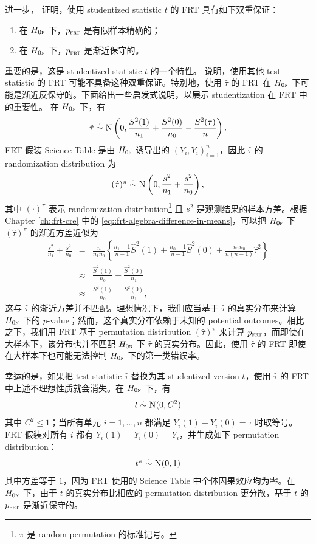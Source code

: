 进一步，\citet{ding2017randomization} 证明，使用 studentized statistic $t$ 的 FRT 具有如下双重保证：
\begin{enumerate}
\item 
 在 $H_{0\textsc{f}}$ 下，$p_{\textsc{frt}}$ 是有限样本精确的；
\item
 在 $H_{0\textsc{n}}$ 下，$p_{\textsc{frt}}$ 是渐近保守的。
\end{enumerate}
重要的是，这是 studentized statistic $t$ 的一个特性。\citet{ding2017randomization} 说明，使用其他 test statistic 的 FRT 可能不具备这种双重保证。特别地，使用 $\hat{\tau}$ 的 FRT 在 $H_{0\textsc{n}}$ 下可能是渐近反保守的。下面给出一些启发式说明，以展示 studentization 在 FRT 中的重要性。
在 $H_{0\textsc{n}}$ 下，有
$$
\hat{\tau} \stackrel{\cdot}{\sim} \textsc{N}\left(0,    \frac{S^2(1)}{n_1} + \frac{S^2(0)}{n_0} -  \frac{S^2(\tau)}{n}    \right).
$$
FRT 假装 Science Table 是由 $H_{0\textsc{f}}$ 诱导出的 $(Y_i, Y_i)_{i=1}^n$，因此 $\hat{\tau} $ 的 randomization distribution 为
$$
(\hat{\tau} )^\pi \stackrel{\cdot}{\sim} \textsc{N}\left(0,    \frac{s^2}{n_1} + \frac{s^2}{n_0}    \right),
$$
其中 $(\cdot)^\pi$ 表示 randomization distribution\footnote{$\pi$ 是 random permutation 的标准记号。}
且
$
s^2 
$
是观测结果的样本方差。根据 Chapter \ref{ch::frt-cre} 中的 \eqref{eq::frt-algebra-difference-in-means}，可以把 $H_{0\textsc{f}}$ 下 $(\hat{\tau} )^\pi$ 的渐近方差近似为
\begin{eqnarray*}
\frac{s^2}{n_1} + \frac{s^2}{n_0} 
& =& \frac{n}{n_1 n_0}  \left\{ 
 \frac{n_1 -1}{ n-1 } \hat S^2(1) + \frac{n_0 - 1}{n-1} \hat S^2(0) + \frac{n_1n_0}{n(n-1)} \hat\tau^2
 \right\} \\
&\approx & \frac{\hat S^2(1) }{n_0} +  \frac{\hat S^2(0) }{n_1} \\ 
&\approx & \frac{  S^2(1) }{n_0} +  \frac{  S^2(0) }{n_1},
\end{eqnarray*}
这与 $\hat{\tau} $ 的渐近方差并不匹配。理想情况下，我们应当基于 $\hat{\tau} $ 的真实分布来计算 $H_{0\textsc{n}}$ 下的 $p$-value；然而，这个真实分布依赖于未知的 potential outcomes。相比之下，我们用 FRT 基于 permutation distribution $(\hat{\tau} )^\pi $ 来计算 $p_{\textsc{frt}}$，而即使在大样本下，该分布也并不匹配 $H_{0\textsc{n}}$ 下 $\hat{\tau} $ 的真实分布。因此，使用 $\hat\tau$ 的 FRT 即使在大样本下也可能无法控制 $H_{0\textsc{n}}$ 下的第一类错误率。
 
 
幸运的是，如果把 test statistic $\hat{\tau} $ 替换为其 studentized version $t$，使用 $\hat\tau$ 的 FRT 中上述不理想性质就会消失。在 $H_{0\textsc{n}}$ 下，有
$$
t \stackrel{\cdot}{\sim} \textsc{N}(0,  C^2)
$$ 
其中 $C^2 \leq 1$；当所有单元 $i=1, \ldots, n$ 都满足 $Y_i(1) - Y_i(0) = \tau$ 时取等号。FRT 假装对所有 $i$ 都有 $Y_i(1) = Y_i(0) = Y_i$，并生成如下 permutation distribution：
$$
t^\pi \stackrel{\cdot}{\sim} \textsc{N}(0,  1)
$$
其中方差等于 $1$，因为 FRT 使用的 Science Table 中个体因果效应均为零。在 $H_{0\textsc{n}}$ 下，由于 $t$ 的真实分布比相应的 permutation distribution 更分散，基于 $t$ 的 $p_{\textsc{frt}}$ 是渐近保守的。

